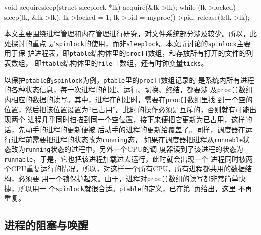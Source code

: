 \documentclass{swfcthesismscctex}
\begin{document}
\begin{listing}
  \begin{codeblock}
\begin{ccode}
void
acquiresleep(struct sleeplock *lk)
{
  acquire(&lk->lk);
  while (lk->locked) {
    sleep(lk, &lk->lk);
  }
  lk->locked = 1;
  lk->pid = myproc()->pid;
  release(&lk->lk);
}
\end{ccode}
  \end{codeblock}
  \label{src:acquiresleep}
\end{listing}

本文主要围绕进程管理和内存管理进行研究，对文件系统部分涉及较少。所以，此处探讨的重点
是\texttt{spinlock}的使用，而非\texttt{sleeplock}。本文所讨论的\texttt{spinlock}主要用于保
护进程表，即\texttt{ptable}结构体里的\texttt{proc[]}数组，和存放所有打开的文件的列表数组，
即\texttt{ftable}结构体里的\texttt{file[]}数组，还有时钟变量\texttt{ticks}。

以保护\texttt{ptable}的\texttt{spinlock}为例，\texttt{ptable}里的\texttt{proc[]}数组记录的
是系统内所有进程的各种状态信息，每一次进程的创建、运行、切换、终结，都要涉
及\texttt{proc[]}数组内相应的数据的读写。其中，进程在创建时，需要在\texttt{proc[]}数组里找
到一个空的位置，然后把该位置设置为``已占用''。此时的操作必须是互斥的，否则就有可能出现两个
进程几乎同时扫描到同一个空位置，接下来便把它更新为已占用，这样的话，先动手的进程的更新便被
后动手的进程的更新给覆盖了。同样，调度器在运行进程前需要把进程的状态改为\texttt{running}态，
如果在调度器把进程从\texttt{runnable}状态改为\texttt{running}状态的过程中，另外一个CPU的调
度器读到了该进程的状态为\texttt{runnable}，于是，它也把该进程加载过去运行，此时就会出现一个
进程同时被两个CPU重复运行的情况。所以，对这样一个所有CPU，所有进程都共用的数据结构，必须要
用一个锁保护起来。由于，进程对\texttt{proc[]}数组的读写都非常简单快捷，所以用一
个\texttt{spinlock}就很合适。\texttt{ptable}的定义，已在第~\pageref{fig:ptable}页给出，这里
不再重复。

\subsection{进程的阻塞与唤醒}
\end{document}
